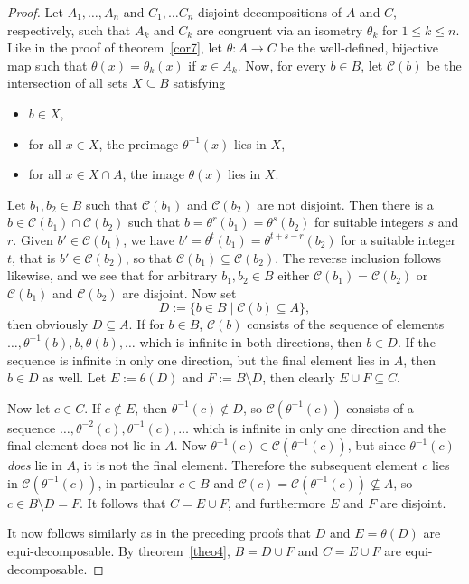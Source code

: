 \documentclass[12pt]{article}
\newcommand{\mc}{\mathcal}
\begin{document}
\begin{proof}
Let $A_1,\ldots,A_n$ and $C_1,\ldots C_n$ disjoint decompositions of
$A$ and $C$, respectively, such that $A_k$ and $C_k$ are congruent via
an isometry $\theta_k$ for $1\leq k\leq n$. Like in the proof of
theorem~\ref{cor7}, let $\theta\colon A\to C$ be the well-defined,
bijective map such that $\theta(x)=\theta_k(x)$ if $x\in A_k$. Now,
for every $b\in B$, let $\mc{C}(b)$ be the intersection of all sets
$X\subseteq B$ satisfying
\begin{itemize}
\item$b\in X$,
\item for all $x\in X$, the preimage $\theta^{-1}(x)$ lies in $X$,
\item for all $x\in X\cap A$, the image $\theta(x)$ lies in $X$.
\end{itemize}
Let $b_1,b_2\in B$ such that $\mc{C}(b_1)$ and $\mc{C}(b_2)$ are not
disjoint. Then there is a $b\in\mc{C}(b_1)\cap\mc{C}(b_2)$ such that
$b=\theta^r(b_1)=\theta^s(b_2)$ for suitable integers $s$ and
$r$. Given $b'\in\mc{C}(b_1)$, we have
$b'=\theta^t(b_1)=\theta^{t+s-r}(b_2)$ for a suitable integer $t$,
that is $b'\in\mc{C}(b_2)$, so that
$\mc{C}(b_1)\subseteq\mc{C}(b_2)$. The reverse inclusion follows
likewise, and we see that for arbitrary $b_1,b_2\in B$ either
$\mc{C}(b_1)=\mc{C}(b_2)$ or $\mc{C}(b_1)$ and $\mc{C}(b_2)$ are
disjoint. Now set
\begin{equation*}
D:=\{b\in B\mid\mc{C}(b)\subseteq A\},
\end{equation*}
then obviously $D\subseteq A$. If for $b\in B$, $\mc{C}(b)$ consists
of the sequence of elements
$\ldots,\theta^{-1}(b),b,\theta(b),\ldots$ which is infinite in both
directions, then $b\in D$. If the sequence is infinite in only one
direction, but the final element lies in $A$, then $b\in D$ as well.
Let $E:=\theta(D)$ and $F:=B\setminus D$, then clearly $E\cup F\subseteq
C$.

Now let $c\in C$. If $c\notin E$, then $\theta^{-1}(c)\notin D$, so
$\mc{C}(\theta^{-1}(c))$ consists of a sequence
$\ldots,\theta^{-2}(c),\theta^{-1}(c),\ldots$ which is infinite in
only one direction and the final element does not lie in $A$. Now
$\theta^{-1}(c)\in\mc{C}(\theta^{-1}(c))$, but since $\theta^{-1}(c)$
\emph{does} lie in $A$, it is not the final element. Therefore the
subsequent element $c$ lies in $\mc{C}(\theta^{-1}(c))$, in particular
$c\in B$ and $\mc{C}(c)=\mc{C}(\theta^{-1}(c))\not\subseteq A$, so
$c\in B\setminus D=F$. It follows that $C=E\cup F$, and furthermore $E$
and $F$ are disjoint.

It now follows similarly as in the preceding proofs that $D$ and
$E=\theta(D)$ are equi-decomposable. By theorem~\ref{theo4}, $B=D\cup
F$ and $C=E\cup F$ are equi-decomposable.
\end{proof}
\medskip
\end{document}

